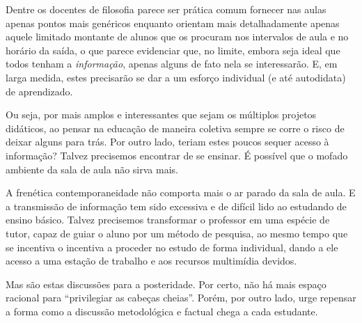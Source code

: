 \documentclass[12pt,a4paper]{article}
\begin{document}
	Dentre os docentes de filosofia parece ser prática comum fornecer 
	nas aulas apenas pontos mais genéricos enquanto orientam mais 
	detalhadamente apenas aquele limitado montante de alunos que os 
	procuram nos intervalos de aula e no horário da saída, o que 
	parece evidenciar que, no limite, embora seja ideal que todos 
	tenham a \emph{informação}, apenas alguns de fato nela se 
	interessarão. E, em larga medida, estes precisarão se dar a um 
	esforço individual (e até autodidata) de aprendizado. 

	Ou seja, por mais amplos e interessantes que sejam os múltiplos 
	projetos didáticos, ao pensar na educação de maneira coletiva 
	sempre se corre o risco de deixar alguns para trás. Por outro 
	lado, teriam estes poucos sequer acesso à informação? Talvez 
	precisemos encontrar de se ensinar. É possível que o mofado 
	ambiente da sala de aula não sirva mais. 

	A frenética contemporaneidade não comporta mais o ar parado da 
	sala de aula. E a transmissão de informação tem sido excessiva e 
	de difícil lido ao estudando de ensino básico. Talvez precisemos 
	transformar o professor em uma espécie de tutor, capaz de guiar 
	o aluno por um método de pesquisa, ao mesmo tempo que se incentiva 
	o incentiva a proceder no estudo de forma individual, dando a ele 
	acesso a uma estação de trabalho e aos recursos multimídia devidos. 

	Mas são estas discussões para a posteridade. Por certo, não há 
	mais espaço racional para “privilegiar as cabeças cheias”. Porém, 
	por outro lado, urge repensar a forma como a discussão metodológica 
	e factual chega a cada estudante. 

	\newpage
	
	
	
\end{document}
